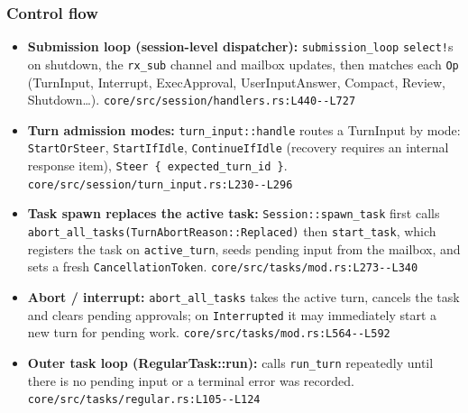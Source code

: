 \subsubsection*{Control flow}
\begin{itemize}
\item \textbf{Submission loop (session-level dispatcher):} \texttt{submission\_\allowbreak{}loop} \texttt{select!}s on shutdown, the \texttt{rx\_\allowbreak{}sub} channel and mailbox updates, then matches each \texttt{Op} (TurnInput, Interrupt, ExecApproval, UserInputAnswer, Compact, Review, Shutdown\ldots{}). \texttt{core/\allowbreak{}src/\allowbreak{}session/\allowbreak{}handlers.\allowbreak{}rs:\allowbreak{}L440-\allowbreak{}-\allowbreak{}L727}
\item \textbf{Turn admission modes:} \texttt{turn\_\allowbreak{}input:\allowbreak{}:\allowbreak{}handle} routes a TurnInput by mode: \texttt{StartOrSteer}, \texttt{StartIfIdle}, \texttt{ContinueIfIdle} (recovery requires an internal response item), \texttt{Steer \{ expected\_\allowbreak{}turn\_\allowbreak{}id \}}. \texttt{core/\allowbreak{}src/\allowbreak{}session/\allowbreak{}turn\_\allowbreak{}input.\allowbreak{}rs:\allowbreak{}L230-\allowbreak{}-\allowbreak{}L296}
\item \textbf{Task spawn replaces the active task:} \texttt{Session:\allowbreak{}:\allowbreak{}spawn\_\allowbreak{}task} first calls \texttt{abort\_\allowbreak{}all\_\allowbreak{}tasks(\allowbreak{}TurnAbortReason:\allowbreak{}:\allowbreak{}Replaced)} then \texttt{start\_\allowbreak{}task}, which registers the task on \texttt{active\_\allowbreak{}turn}, seeds pending input from the mailbox, and sets a fresh \texttt{CancellationToken}. \texttt{core/\allowbreak{}src/\allowbreak{}tasks/\allowbreak{}mod.\allowbreak{}rs:\allowbreak{}L273-\allowbreak{}-\allowbreak{}L340}
\item \textbf{Abort / interrupt:} \texttt{abort\_\allowbreak{}all\_\allowbreak{}tasks} takes the active turn, cancels the task and clears pending approvals; on \texttt{Interrupted} it may immediately start a new turn for pending work. \texttt{core/\allowbreak{}src/\allowbreak{}tasks/\allowbreak{}mod.\allowbreak{}rs:\allowbreak{}L564-\allowbreak{}-\allowbreak{}L592}
\item \textbf{Outer task loop (RegularTask::run):} calls \texttt{run\_\allowbreak{}turn} repeatedly until there is no pending input or a terminal error was recorded. \texttt{core/\allowbreak{}src/\allowbreak{}tasks/\allowbreak{}regular.\allowbreak{}rs:\allowbreak{}L105-\allowbreak{}-\allowbreak{}L124}

\end{itemize}
